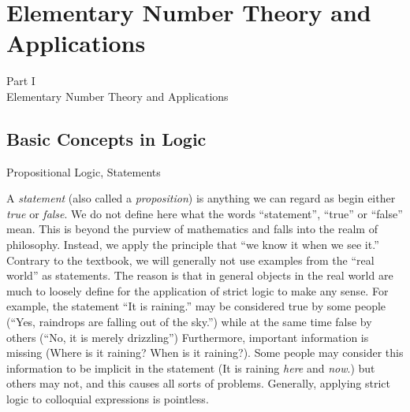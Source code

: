 \documentclass[smaller,hyperref={CJKbookmarks=true}]{beamer}
\begin{document}
\section{Elementary Number Theory and Applications}
\begin{frame}
  \begin{center}
  \LARGE{Part I}\\ \alert{Elementary Number Theory and Applications}
\end{center}
\end{frame}
\begin{frame} \begin{spacing}{2}
\tableofcontents[currentsubsection,hideothersubsections,sectionstyle=hide]
\end{spacing}
\end{frame}
\subsection{Basic Concepts in Logic}
\begin{frame}[c] \begin{spacing}{2}
\tableofcontents[sectionstyle=hide,subsectionstyle=show/shaded/hide]
\end{spacing}
\end{frame}
\begin{frame}[t]{Propositional Logic, Statements}
\begin{spacing}{1.05}
A \emph{statement} (also called a \emph{proposition}) is anything we can regard as begin either \emph{true} or \emph{false}. We do not define here what the words ``statement'', ``true'' or ``false'' mean. This is beyond the purview of mathematics and falls into the realm of philosophy. Instead, we apply the principle that ``we know it when we see it.''\\[7pt]
Contrary to the textbook, we will generally not use examples from the ``real world'' as statements. The reason is that in general objects in the real world are much to loosely define for the application of strict logic to make any sense. For example, the statement ``It is raining.'' may be considered true by some people (``Yes, raindrops are falling out of the sky.'') while at the same time false by others (``No, it is merely drizzling'') Furthermore, important information is missing (Where is it raining? When is it raining?). Some people may consider this information to be implicit in the statement (It is raining \emph{here} and \emph{now}.) but others may not, and this causes all sorts of problems. Generally, applying strict logic to colloquial expressions is pointless.
\end{spacing}
\end{frame}
\end{document}
